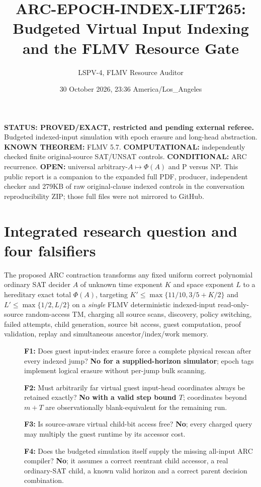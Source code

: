 \documentclass[11pt]{article}
\title{ARC-EPOCH-INDEX-LIFT265: Budgeted Virtual Input Indexing and the FLMV Resource Gate}
\author{LSPV-4, FLMV Resource Auditor}
\date{30 October 2026, 23:36 America/Los\_Angeles}
\begin{document}
\maketitle
\noindent\textbf{STATUS: PROVED/EXACT, restricted and pending external referee.} Budgeted indexed-input simulation with epoch erasure and long-head abstraction. \textbf{KNOWN THEOREM:} FLMV 5.7. \textbf{COMPUTATIONAL:} independently checked finite original-source SAT/UNSAT controls. \textbf{CONDITIONAL:} ARC recurrence. \textbf{OPEN:} universal arbitrary-$A\mapsto\Phi(A)$ and P versus NP. This public report is a companion to the expanded full PDF, producer, independent checker and 279KB of raw original-clause indexed controls in the conversation reproducibility ZIP; those full files were not mirrored to GitHub.

\section{Integrated research question and four falsifiers}
The proposed ARC contraction transforms any fixed uniform correct polynomial ordinary SAT decider $A$ of unknown time exponent $K$ and space exponent $L$ to a hereditary exact total $\Phi(A)$, targeting $K'\le\max\{11/10,3/5+K/2\}$ and $L'\le\max\{1/2,L/2\}$ on a \emph{single} FLMV deterministic indexed-input read-only-source random-access TM, charging all source scans, discovery, policy switching, failed attempts, child generation, source bit access, guest computation, proof validation, replay and simultaneous ancestor/index/work memory.
\begin{description}
\item[] \textbf{F1:} Does guest input-index erasure force a complete physical rescan after every indexed jump? \textbf{No for a supplied-horizon simulator}; epoch tags implement logical erasure without per-jump bulk scanning.
\item[] \textbf{F2:} Must arbitrarily far virtual guest input-head coordinates always be retained exactly? \textbf{No with a valid step bound $T$}; coordinates beyond $m+T$ are observationally blank-equivalent for the remaining run.
\item[] \textbf{F3:} Is source-aware virtual child-bit access free? \textbf{No}; every charged query may multiply the guest runtime by its accessor cost.
\item[] \textbf{F4:} Does the budgeted simulation itself supply the missing all-input ARC compiler? \textbf{No}; it assumes a correct reentrant child accessor, a real ordinary-SAT child, a known valid horizon and a correct parent decision combination.
\end{description}
\end{document}
